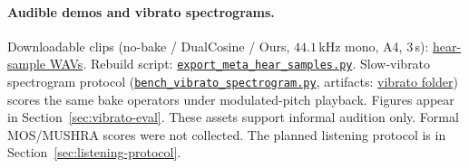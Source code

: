 
\paragraph{Audible demos and vibrato spectrograms.}
Downloadable clips (no-bake / DualCosine / Ours, $44.1$\,kHz mono, A4, $3$\,s):
\href{https://github.com/reeldemo/reelsynth/tree/main/brand/artifacts/meta_approach_compare/hear_samples}{hear-sample WAVs}.
Rebuild script:
\href{https://github.com/reeldemo/reelsynth/blob/main/scripts/export_meta_hear_samples.py}{\texttt{export\_meta\_hear\_samples.py}}.
Slow-vibrato spectrogram protocol
(\href{https://github.com/reeldemo/reelsynth/blob/main/scripts/bench_vibrato_spectrogram.py}{\texttt{bench\_vibrato\_spectrogram.py}},
artifacts:
\href{https://github.com/reeldemo/reelsynth/tree/main/brand/artifacts/vibrato_spectrogram}{vibrato folder})
scores the same bake operators under modulated-pitch playback. Figures appear in Section~\ref{sec:vibrato-eval}.
These assets support informal audition only.
Formal MOS/MUSHRA scores were not collected. The planned listening protocol is in Section~\ref{sec:listening-protocol}.
